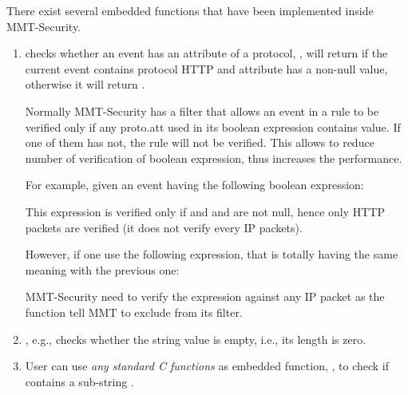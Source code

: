  There exist several embedded functions that have been implemented inside MMT-Security.

\begin{enumerate}
    \item {} checks whether an event has an attribute of a protocol, \eg,  will return  if the current event contains protocol HTTP and attribute  has a non-null value, otherwise it will return .

    Normally MMT-Security has a filter that allows an event in a rule to be verified only if any proto.att used in its boolean expression contains value. If one of them has not, the rule will not be verified. This allows to reduce number of verification of boolean expression, thus increases the performance.

    For example, given an event having the following boolean expression:
    
    \begin{center}
    \end{center}

    This expression is verified only if  and  and  are not null, hence only HTTP packets are verified (it does not verify every IP packets).

    However, if one use the following expression, that is totally having the same meaning with the previous one:

    \begin{center}
    \end{center}
    
    MMT-Security need to verify the expression against any IP packet as the  function tell MMT to exclude  from its filter.


    \item {}, e.g.,  checks whether the string value is empty, i.e., its length is zero.

    \item User can use {\em any standard C functions} as embedded function, \eg,  to check if  contains a sub-string .
    

\end{enumerate}
